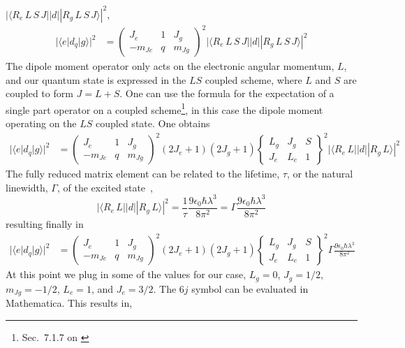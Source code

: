 \documentclass[11pt,letter]{article}
\begin{document}
$|\langle R_{e}\, L\,S\,J || d || R_{g}\,
L\,S\,J
\rangle|^{2}$, 
\begin{align} |\langle e | d_{q} | g \rangle|^{2} & =
\begin{pmatrix} J_{e} & 1 & J_{g} \\ -m_{Je} & q & m_{Jg} \end{pmatrix}^{2}
|\langle R_{e}\, L\,S\,J || d || R_{g}\, L\,S\,J \rangle|^{2} 
\end{align} 
The
dipole moment operator only acts on the electronic angular momentum, $L$, and
our quantum state is expressed in the $LS$ coupled scheme, where $L$ and $S$
are coupled to form $J=L+S$.  One can use the formula for the expectation of a
single part operator on a coupled scheme\footnote{Sec.~7.1.7 on
\cite{edmonds1996angular}}, in this case the dipole moment operating on the
$LS$ coupled state. One obtains \begin{align} |\langle e | d_{q} | g
\rangle|^{2} & = \begin{pmatrix} J_{e} & 1 & J_{g} \\ -m_{Je} & q & m_{Jg}
\end{pmatrix}^{2} (2J_{e}+1)(2J_{g}+1)  \begin{Bmatrix}L_{g} & J_{g} & S \\
J_{e} & L_{e} & 1 \end{Bmatrix}^{2}|\langle R_{e}\, L || d || R_{g}\, L
\rangle|^{2} \end{align} The fully reduced matrix element can be related to the
lifetime, $\tau$, or the natural linewidth, $\Gamma$, of the excited
state~\cite{Olivares:98}, \[ |\langle R_{e}\, L || d || R_{g}\, L \rangle|^{2}
= \frac{1}{\tau} \frac{ 9\epsilon_{0} \hbar \lambda^{3}}{8 \pi^{2}} =
\Gamma\frac{ 9\epsilon_{0} \hbar \lambda^{3}}{8 \pi^{2}} \] resulting finally
in \begin{align} |\langle e | d_{q} | g \rangle|^{2} & = \begin{pmatrix} J_{e}
& 1 & J_{g} \\ -m_{Je} & q & m_{Jg} \end{pmatrix}^{2} (2J_{e}+1)(2J_{g}+1)
\begin{Bmatrix}L_{g} & J_{g} & S \\ J_{e} & L_{e} & 1
\end{Bmatrix}^{2}\Gamma\frac{ 9\epsilon_{0} \hbar \lambda^{3}}{8 \pi^{2}}
\end{align} At this point we plug in some of the values for our case,
$L_{g}=0$, $J_{g} = 1/2$, $m_{Jg}=-1/2$, $L_{e}=1$, and $J_{e}=3/2$.  The $6j$
symbol can be evaluated in Mathematica.  This results in,
\end{document}
